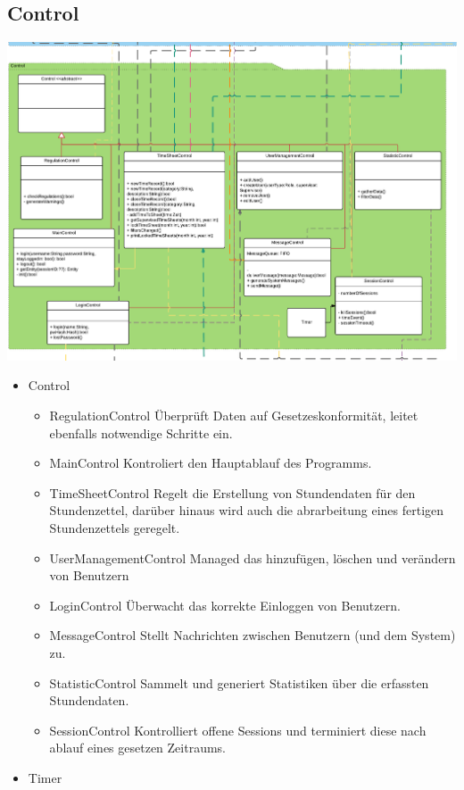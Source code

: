    \subsection{Control}
        \includegraphics[width=\linewidth]{Diagramms/class/control.pdf}\\
        \begin{itemize}
            \item{Control}
                \begin{itemize}
                    \item{RegulationControl}
                       Überprüft Daten auf Gesetzeskonformität, leitet ebenfalls notwendige Schritte ein.
                    \item{MainControl}
                        Kontroliert den Hauptablauf des Programms.
                    \item{TimeSheetControl}
                        Regelt die Erstellung von Stundendaten für den Stundenzettel, darüber hinaus wird auch die abrarbeitung eines fertigen Stundenzettels geregelt.
                    \item{UserManagementControl}
                        Managed das hinzufügen, löschen und verändern von Benutzern
                    \item{LoginControl}
                        Überwacht das korrekte Einloggen von Benutzern.
                    \item{MessageControl}
                        Stellt Nachrichten zwischen Benutzern (und dem System) zu.
                    \item{StatisticControl}
                        Sammelt und generiert Statistiken über die erfassten Stundendaten.
                    \item{SessionControl}
                        Kontrolliert offene Sessions und terminiert diese nach ablauf eines gesetzen Zeitraums.
                \end{itemize}
            \item{Timer}
        \end{itemize}

